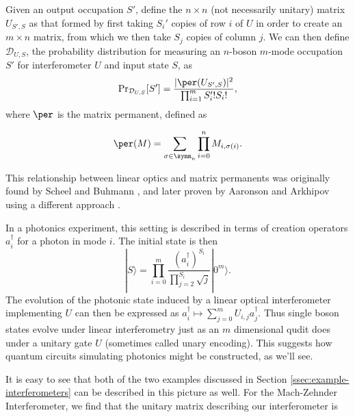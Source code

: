 Given an output occupation $S'$, define the $n \times n$ (not necessarily unitary) matrix $U_{S',S}$ as that formed by first taking $S_i'$ copies of row $i$ of $U$ in order to create an $m\times n$ matrix, from which we then take $S_j$ copies of column $j$. 
We can then define $\mathcal{D}_{U,S}$, the probability distribution for measuring an $n$-boson $m$-mode occupation $S'$ for interferometer $U$ and input state $S$, as
\begin{equation}\label{eqn:bs-distribution}
\textrm{Pr}_{\mathcal{D}_{U,S}}[S'] = \frac{|\per(U_{S',S})|^2}{\prod_{i=1}^m S_i'! S_i!} ,
\end{equation}
where $\per$ is the matrix permanent, defined as

\begin{equation}
\per(M) = \sum_{\sigma\in\symm_n}\prod_{i=0}^nM_{i,\sigma(i)}.
\label{eqn:permanent}
\end{equation}

This relationship between linear optics and matrix permanents was originally found by Scheel and Buhmann \cite{scheel2008}, and later proven by Aaronson and Arkhipov using a different approach \cite{aaronson2010report, aaronson2011}.

In a photonics experiment, this setting is described in terms of creation operators $a^\dag_i$ for a photon in mode $i$. 
The initial state is then
\begin{equation}
|S\rangle = \prod_{i=0}^m \frac{(a_i^\dagger)^{S_i}}{\prod_{j=2}^{S_i}\sqrt{j}}|0^m\rangle.
\end{equation}
The evolution of the photonic state induced by a linear optical interferometer implementing $U$ can then be expressed as $a_i^\dagger \mapsto \sum_{j = 0}^m U_{i,j}a_j^\dagger$.
Thus single boson states evolve under linear interferometry just as an $m$ dimensional qudit does under a unitary gate $U$ (sometimes called unary encoding).
This suggests how quantum circuits simulating photonics might be constructed, as we'll see.

It is easy to see that both of the two examples discussed in Section \ref{ssec:example-interferometers} can be described in this picture as well. For the Mach-Zehnder Interferometer, we find that the unitary matrix describing our interferometer is


